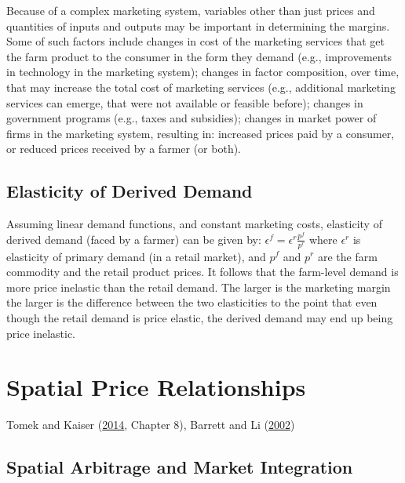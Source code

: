 \documentclass[
]{book}
\begin{document}
Because of a complex marketing system, variables other than just prices and quantities of inputs and outputs may be important in determining the margins. Some of such factors include changes in cost of the marketing services that get the farm product to the consumer in the form they demand (e.g., improvements in technology in the marketing system); changes in factor composition, over time, that may increase the total cost of marketing services (e.g., additional marketing services can emerge, that were not available or feasible before); changes in government programs (e.g., taxes and subsidies); changes in market power of firms in the marketing system, resulting in: increased prices paid by a consumer, or reduced prices received by a farmer (or both).

\hypertarget{elasticity-of-derived-demand}{%
\section{Elasticity of Derived Demand}\label{elasticity-of-derived-demand}}

Assuming linear demand functions, and constant marketing costs, elasticity of derived demand (faced by a farmer) can be given by: \(\epsilon^f = \epsilon^r\frac{p^f}{p^r}\) where \(\epsilon^r\) is elasticity of primary demand (in a retail market), and \(p^f\) and \(p^r\) are the farm commodity and the retail product prices. It follows that the farm-level demand is more price inelastic than the retail demand. The larger is the marketing margin the larger is the difference between the two elasticities to the point that even though the retail demand is price elastic, the derived demand may end up being price inelastic.

\hypertarget{spatial-price-relationships}{%
\chapter{Spatial Price Relationships}\label{spatial-price-relationships}}

Tomek and Kaiser (\protect\hyperlink{ref-tomek2014}{2014}, Chapter 8), Barrett and Li (\protect\hyperlink{ref-barrett2002}{2002})

\hypertarget{spatial-arbitrage-and-market-integration}{%
\section{Spatial Arbitrage and Market Integration}\label{spatial-arbitrage-and-market-integration}}
\end{document}
